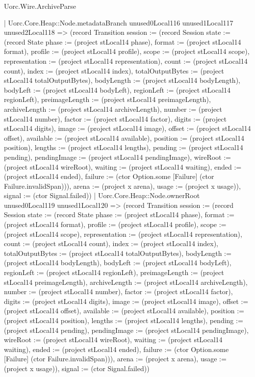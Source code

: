\begin{lexlean}{Uorc.Wire.ArchiveParse}
\begin{semanticmodule}
{            | Uorc.Core.Heap::Node.metadataBranch unused0Local116 unused1Local117 unused2Local118 => (record Transition {session := (record Session {state := (record State {phase := (project stLocal14 phase), format := (project stLocal14 format), profile := (project stLocal14 profile), scope := (project stLocal14 scope), representation := (project stLocal14 representation), count := (project stLocal14 count), index := (project stLocal14 index), totalOutputBytes := (project stLocal14 totalOutputBytes), bodyLength := (project stLocal14 bodyLength), bodyLeft := (project stLocal14 bodyLeft), regionLeft := (project stLocal14 regionLeft), preimageLength := (project stLocal14 preimageLength), archiveLength := (project stLocal14 archiveLength), number := (project stLocal14 number), factor := (project stLocal14 factor), digits := (project stLocal14 digits), image := (project stLocal14 image), offset := (project stLocal14 offset), available := (project stLocal14 available), position := (project stLocal14 position), lengths := (project stLocal14 lengths), pending := (project stLocal14 pending), pendingImage := (project stLocal14 pendingImage), wireRoot := (project stLocal14 wireRoot), waiting := (project stLocal14 waiting), ended := (project stLocal14 ended), failure := (ctor Option.some [Failure] (ctor Failure.invalidSpan))}), arena := (project x arena), usage := (project x usage)}), signal := (ctor Signal.failed)})
            | Uorc.Core.Heap::Node.ownerRoot unused0Local119 unused1Local120 => (record Transition {session := (record Session {state := (record State {phase := (project stLocal14 phase), format := (project stLocal14 format), profile := (project stLocal14 profile), scope := (project stLocal14 scope), representation := (project stLocal14 representation), count := (project stLocal14 count), index := (project stLocal14 index), totalOutputBytes := (project stLocal14 totalOutputBytes), bodyLength := (project stLocal14 bodyLength), bodyLeft := (project stLocal14 bodyLeft), regionLeft := (project stLocal14 regionLeft), preimageLength := (project stLocal14 preimageLength), archiveLength := (project stLocal14 archiveLength), number := (project stLocal14 number), factor := (project stLocal14 factor), digits := (project stLocal14 digits), image := (project stLocal14 image), offset := (project stLocal14 offset), available := (project stLocal14 available), position := (project stLocal14 position), lengths := (project stLocal14 lengths), pending := (project stLocal14 pending), pendingImage := (project stLocal14 pendingImage), wireRoot := (project stLocal14 wireRoot), waiting := (project stLocal14 waiting), ended := (project stLocal14 ended), failure := (ctor Option.some [Failure] (ctor Failure.invalidSpan))}), arena := (project x arena), usage := (project x usage)}), signal := (ctor Signal.failed)})
}
\end{semanticmodule}
\end{lexlean}
